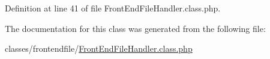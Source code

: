 Definition at line 41 of file Front\+End\+File\+Handler.\+class.\+php.



The documentation for this class was generated from the following file\+:\begin{DoxyCompactItemize}
\item 
classes/frontendfile/\hyperlink{FrontEndFileHandler_8class_8php}{Front\+End\+File\+Handler.\+class.\+php}\end{DoxyCompactItemize}
